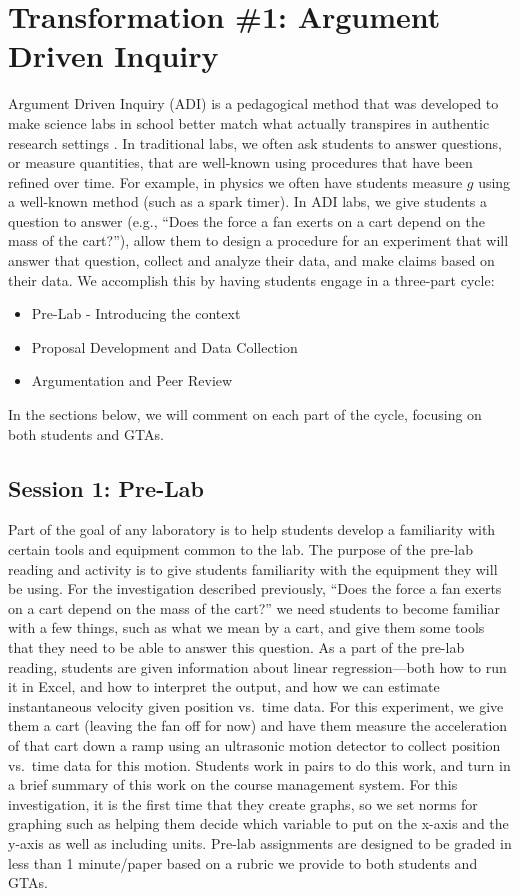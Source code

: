 \documentclass[aip, numerical, preprint]{revtex4-2}
\begin{document}
\section{Transformation \#1: Argument Driven Inquiry}
Argument Driven Inquiry (ADI) is a pedagogical method that was developed to make science labs
in school better match what actually transpires in authentic research settings
\cite{Walker2011,Sampson2011,Walker2016}.  In traditional labs, we often ask students to answer
questions, or measure quantities, that are well-known using procedures that have been refined
over time.  For example, in physics we often have students measure $g$ using a well-known
method (such as a spark timer).  In ADI labs, we give students a question to answer (e.g.,
``Does the force a fan exerts on a cart depend on the mass of the cart?''), allow them to
design a procedure for an experiment that will answer that question, collect and analyze their
data, and make claims based on their data.  We accomplish this by having students engage in a
three-part cycle:
\begin{itemize}
  \item Pre-Lab - Introducing the context
  \item Proposal Development and Data Collection
  \item Argumentation and Peer Review
\end{itemize}
In the sections below, we will comment on each part of the cycle, focusing on both students and
GTAs.

\subsection{Session 1: Pre-Lab}
Part of the goal of any laboratory is to help students develop a familiarity with certain tools
and equipment common to the lab.  The purpose of the pre-lab reading and activity is to give
students familiarity with the equipment they will be using.  For the investigation 
described previously, ``Does the force a fan exerts on a cart depend on the mass of the cart?''
we need students to become familiar with a few things, such as what we mean by a cart, and give
them some tools that they need to be able to answer this question.  As a part of the pre-lab
reading, students are given information about linear regression---both how to run it in Excel, and
how to interpret the output, and how we can estimate instantaneous velocity given position
vs.\ time data. For this experiment, we give them a cart (leaving the fan off for now) and have
them measure the acceleration of that cart down a ramp using an ultrasonic motion detector to
collect position vs.\ time data for this motion.  Students work in pairs to do this work, and
turn in a brief summary of this work on the course management system.  For this investigation,
it is the first time that they create graphs, so we set norms for graphing such as helping them
decide which variable to put on the x-axis and the y-axis as well as including units.  Pre-lab
assignments are designed to be graded in less than 1 minute/paper based on a rubric we provide
to both students and GTAs.
\end{document}
